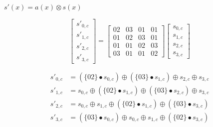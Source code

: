 \documentclass{article}
\begin{document}

$s'(x) = a(x) \otimes s(x)$

\begin{equation*}
\begin{bmatrix}
s'_{0,c} \\ s'_{1,c} \\ s'_{2,c} \\ s'_{3,c}
\end{bmatrix} = \begin{bmatrix}
02 & 03 & 01 & 01 \\ 01 & 02 & 03 & 01 \\ 01 & 01 & 02 & 03 \\ 03 & 01 & 01 & 02
\end{bmatrix} \begin{bmatrix}
s_{0,c} \\ s_{1,c} \\ s_{2,c} \\ s_{3,c}
\end{bmatrix}
\end{equation*}

\begin{align*}
 s'_{0,c} &= (\{02\} \bullet s_{0,c}) \oplus (\{03\} \bullet s_{1,c}) \oplus s_{2,c} \oplus s_{3,c} \\
 s'_{1,c} &= s_{0,c} \oplus (\{02\} \bullet s_{1,c}) \oplus (\{03\} \bullet s_{2,c}) \oplus s_{3,c} \\
 s'_{2,c} &= s_{0,c} \oplus s_{1,c} \oplus (\{02\} \bullet s_{1,c}) \oplus (\{03\} \bullet s_{3,c}) \\
 s'_{3,c} &= (\{03\} \bullet s_{0,c}) \oplus s_{0,c} \oplus s_{1,c} \oplus (\{02\} \bullet s_{3,c}) 
\end{align*}
\end{document}
